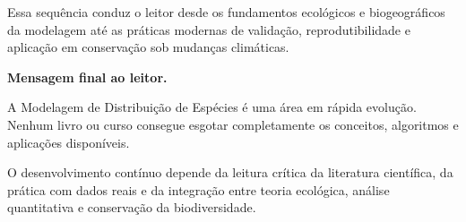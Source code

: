 Essa sequência conduz o leitor desde os fundamentos ecológicos e
biogeográficos da modelagem até as práticas modernas de validação,
reprodutibilidade e aplicação em conservação sob mudanças climáticas.

\begin{dica}
	\textbf{Mensagem final ao leitor.}
	
	A Modelagem de Distribuição de Espécies é uma área em rápida evolução.
	Nenhum livro ou curso consegue esgotar completamente os conceitos,
	algoritmos e aplicações disponíveis.
	
	O desenvolvimento contínuo depende da leitura crítica da literatura
	científica, da prática com dados reais e da integração entre teoria
	ecológica, análise quantitativa e conservação da biodiversidade.
\end{dica}

